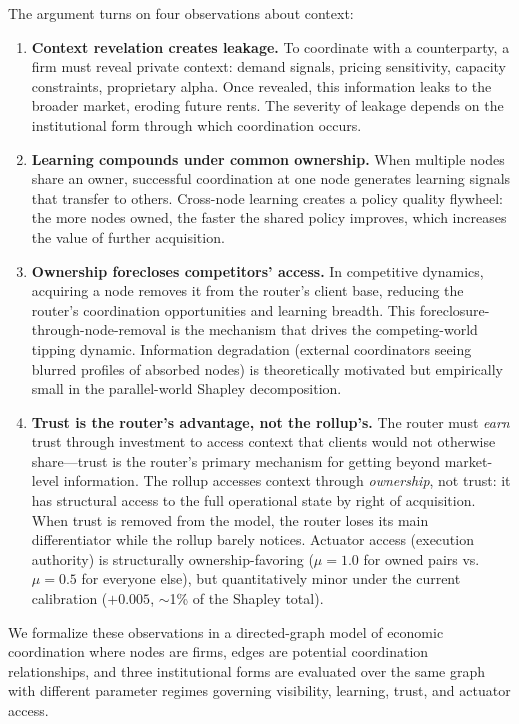 \documentclass[12pt]{article}
\theoremstyle{definition}
\begin{document}
The argument turns on four observations about context:

\begin{enumerate}[leftmargin=*]
\item \textbf{Context revelation creates leakage.} To coordinate with a counterparty, a firm must reveal private context: demand signals, pricing sensitivity, capacity constraints, proprietary alpha. Once revealed, this information leaks to the broader market, eroding future rents. The severity of leakage depends on the institutional form through which coordination occurs.

\item \textbf{Learning compounds under common ownership.} When multiple nodes share an owner, successful coordination at one node generates learning signals that transfer to others. Cross-node learning creates a policy quality flywheel: the more nodes owned, the faster the shared policy improves, which increases the value of further acquisition.

\item \textbf{Ownership forecloses competitors' access.} In competitive dynamics, acquiring a node removes it from the router's client base, reducing the router's coordination opportunities and learning breadth. This foreclosure-through-node-removal is the mechanism that drives the competing-world tipping dynamic. Information degradation (external coordinators seeing blurred profiles of absorbed nodes) is theoretically motivated but empirically small in the parallel-world Shapley decomposition.

\item \textbf{Trust is the router's advantage, not the rollup's.} The router must \textit{earn} trust through investment to access context that clients would not otherwise share---trust is the router's primary mechanism for getting beyond market-level information. The rollup accesses context through \textit{ownership}, not trust: it has structural access to the full operational state by right of acquisition. When trust is removed from the model, the router loses its main differentiator while the rollup barely notices. Actuator access (execution authority) is structurally ownership-favoring ($\mu = 1.0$ for owned pairs vs.\ $\mu = 0.5$ for everyone else), but quantitatively minor under the current calibration ($+0.005$, $\sim$1\% of the Shapley total).
\end{enumerate}

We formalize these observations in a directed-graph model of economic coordination where nodes are firms, edges are potential coordination relationships, and three institutional forms are evaluated over the same graph with different parameter regimes governing visibility, learning, trust, and actuator access.
\end{document}
